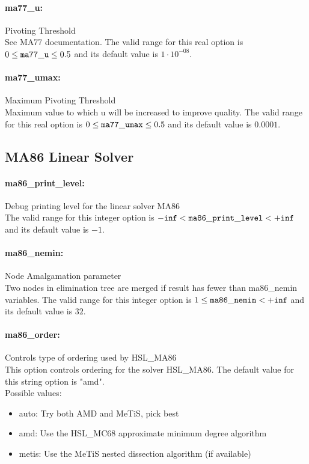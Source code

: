 \paragraph{ma77\_u:}\label{opt:ma77_u} Pivoting Threshold \\
 See MA77 documentation. The valid range for this real option is 
$0 \le {\tt ma77\_u } \le 0.5$
and its default value is $1 \cdot 10^{-08}$.


\paragraph{ma77\_umax:}\label{opt:ma77_umax} Maximum Pivoting Threshold \\
 Maximum value to which u will be increased to
improve quality. The valid range for this real option is 
$0 \le {\tt ma77\_umax } \le 0.5$
and its default value is $0.0001$.


\subsection{MA86 Linear Solver}

\paragraph{ma86\_print\_level:}\label{opt:ma86_print_level} Debug printing level for the linear solver MA86 \\
 The valid range for this integer option is
${\tt -inf} <  {\tt ma86\_print\_level } <  {\tt +inf}$
and its default value is $-1$.


\paragraph{ma86\_nemin:}\label{opt:ma86_nemin} Node Amalgamation parameter \\
 Two nodes in elimination tree are merged if
result has fewer than ma86\_nemin variables. The valid range for this integer option is
$1 \le {\tt ma86\_nemin } <  {\tt +inf}$
and its default value is $32$.


\paragraph{ma86\_order:}\label{opt:ma86_order} Controls type of ordering used by HSL\_MA86 \\
 This option controls ordering for the solver
HSL\_MA86. The default value for this string option is "amd".
\\ 
Possible values:
\begin{itemize}
   \item auto: Try both AMD and MeTiS, pick best
   \item amd: Use the HSL\_MC68 approximate minimum degree
algorithm
   \item metis: Use the MeTiS nested dissection algorithm (if
available)
\end{itemize}

